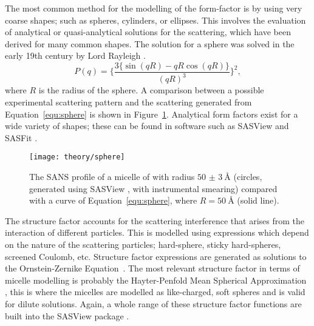 The most common method for the modelling of the form-factor is by using very coarse shapes; such as spheres, cylinders, or ellipses.
This involves the evaluation of analytical or quasi-analytical solutions for the scattering, which have been derived for many common shapes.
The solution for a sphere was solved in the early 19th century by Lord Rayleigh \cite{pedersen_monte_2002}.
%
\begin{equation}
    P(q) = \Bigg\{\frac{3\big\{\sin(qR) - qR\cos(qR)\big\}}{(qR)^3}\Bigg\}^2,
    \label{equ:sphere}
\end{equation}
%
where $R$ is the radius of the sphere. A comparison between a possible experimental scattering pattern and the scattering generated from Equation~\ref{equ:sphere} is shown in Figure~\ref{fig:sphere}. Analytical form factors exist for a wide variety of shapes; these can be found in software such as SASView and SASFit \cite{noauthor_sasview_nodate, noauthor_sasfit_nodate}.
%
\begin{figure}
    \centering
    \texttt{[image: theory/sphere]}
    \caption{The SANS profile of a micelle of  with radius $\SI{50(3)}{\angstrom}$ (circles, generated using SASView \cite{noauthor_sasview_nodate}, with instrumental smearing) compared with a curve of Equation~\ref{equ:sphere}, where $R = \SI{50}{\angstrom}$ (solid line).}
    \label{fig:sphere}
\end{figure}
%

The structure factor accounts for the scattering interference that arises from the interaction of different particles.
This is modelled using expressions which depend on the nature of the scattering particles; hard-sphere, sticky hard-spheres, screened Coulomb, etc.
Structure factor expressions are generated as solutions to the Ornstein-Zernike Equation~\cite{klein_interacting_2002}.
The most relevant structure factor in terms of micelle modelling is probably the Hayter-Penfold Mean Spherical Approximation \cite{hayter_analytic_1981}, this is where the micelles are modelled as like-charged, soft spheres and is valid for dilute solutions.
Again, a whole range of these structure factor functions are built into the SASView package \cite{noauthor_sasview_nodate}.

